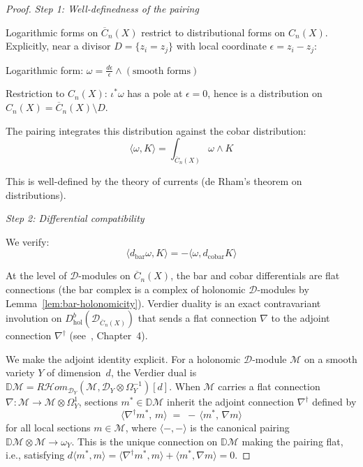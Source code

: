 \begin{proof}
\emph{Step 1: Well-definedness of the pairing}

Logarithmic forms on $\overline{C}_n(X)$ restrict to distributional 
forms on $C_n(X)$. Explicitly, near a divisor $D = \{z_i = z_j\}$ with local 
coordinate $\epsilon = z_i - z_j$:

Logarithmic form: $\omega = \frac{d\epsilon}{\epsilon} \wedge (\text{smooth forms})$

Restriction to $C_n(X)$: $\iota^*\omega$ has a pole at $\epsilon = 0$, hence is 
a distribution on $C_n(X) = \overline{C}_n(X) \setminus D$.

The pairing integrates this distribution against the cobar distribution:
\[\langle \omega, K \rangle = \int_{\overline{C}_n(X)} \omega \wedge K\]

This is well-defined by the theory of currents (de Rham's theorem on distributions).

\emph{Step 2: Differential compatibility}

We verify:
\[\langle d_{\text{bar}}\omega, K \rangle = -\langle \omega, d_{\text{cobar}}K \rangle\]

At the level of $\mathcal{D}$-modules on $\overline{C}_n(X)$, the bar and cobar differentials are flat connections (the bar complex is a complex of holonomic $\mathcal{D}$-modules by Lemma~\ref{lem:bar-holonomicity}).  Verdier duality is an exact contravariant involution on $D^b_{\mathrm{hol}}(\mathcal{D}_{\overline{C}_n(X)})$ that sends a flat connection $\nabla$ to the adjoint connection $\nabla^\dagger$ (see~\cite{KashiwaraSchapira}, Chapter~4).

We make the adjoint identity explicit.  For a holonomic $\mathcal{D}$-module $\mathcal{M}$ on a smooth variety $Y$ of dimension~$d$, the Verdier dual is $\mathbb{D}\mathcal{M} = R\mathcal{H}\!\mathit{om}_{\mathcal{D}_Y}(\mathcal{M}, \mathcal{D}_Y \otimes \Omega_Y^{-1})[d]$.  When $\mathcal{M}$ carries a flat connection $\nabla \colon \mathcal{M} \to \mathcal{M} \otimes \Omega^1_Y$, sections $m^* \in \mathbb{D}\mathcal{M}$ inherit the adjoint connection $\nabla^\dagger$ defined by
\[\langle \nabla^\dagger m^*,\, m \rangle \;=\; -\,\langle m^*,\, \nabla m \rangle\]
for all local sections $m \in \mathcal{M}$, where $\langle -,- \rangle$ is the canonical pairing $\mathbb{D}\mathcal{M} \otimes \mathcal{M} \to \omega_Y$.  This is the unique connection on $\mathbb{D}\mathcal{M}$ making the pairing flat, i.e., satisfying $d\langle m^*, m\rangle = \langle \nabla^\dagger m^*, m\rangle + \langle m^*, \nabla m\rangle = 0$.


\end{proof}

